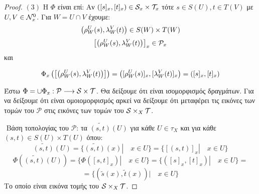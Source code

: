 \begin{proof}
    \noindent $(3)$ Η $\Phi$ είναι επί: Αν $([s]_x, [t]_x) \in \mathcal{S}_x \times \mathcal{T}_x$ τότε $s \in S(U), t \in T(V)$ με $U,V \in \mathcal{N}^0_x$. Για $W=U\cap V$ έχουμε:
    $$\left(\rho^U_W(s),\lambda^V_W(t)\right) \in S(W)\times T(W)$$
    $$\left[\left(\rho^U_W(s), \lambda^V_W(t)\right)\right]_x \in \mathcal{P}_x$$ και

    $$\Phi_x\left( \left[ \left(\rho^U_W(s), \lambda^V_W(t)\right) \right] \right) = \left( [\rho^U_W(s)]_x , [\lambda^V_W(t)]_x\right) = ([s]_x,[t]_x)$$

    \vspace*{0.3cm}
    \noindent Έστω $\Phi = \cup \Phi_x : \mathcal{P}\longrightarrow \mathcal{S} \times \mathcal{T}$. Θα δείξουμε ότι είναι ισομορφισμός δραγμάτων. Για να δείξουμε ότι είναι ομοιομορφισμός αρκεί να δείξουμε ότι μεταφέρει τις εικόνες των τομών του $\mathcal{P}$ στις εικόνες των τομών του $\mathcal{S} \times_X \mathcal{T}$.

    $ $\newline
    Βάση τοπολογίας του $\mathcal{P}$: τα $\widetilde{(s,t)}(U)$ για κάθε $U\in\tau_X$ και για κάθε $(s,t) \in S(U)\times T(U)$ όπου:
    $$\widetilde{(s,t)}(U) = \big\{ \widetilde{(s,t)}(x)| \quad x \in U \big\} = \big\{ [(s,t)]_x| \quad x \in U\big\}$$
    $$\Phi \left(\widetilde{(s,t)}(U)\right) =\big\{ \Phi \left([s,t]_x\right)| \quad x \in U \big\} = \big\{ ([s]_x, [t]_x)| \quad x \in U\big\} = $$
    $$= \big\{ \left(\tilde{s}(x), \tilde{t}(x)\right)| \quad x \in U\big\} $$ Το οποίο είναι εικόνα τομής του $\mathcal{S} \times_X \mathcal{T} $.


\end{proof}
